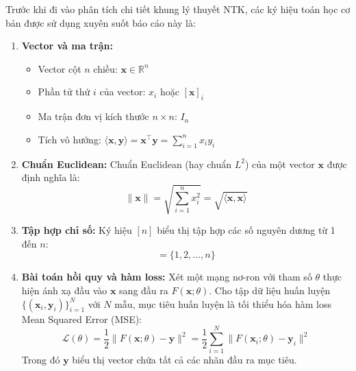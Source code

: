 Trước khi đi vào phân tích chi tiết khung lý thuyết NTK, các ký hiệu toán học cơ bản được sử dụng xuyên suốt báo cáo này là:

\begin{enumerate}
    \item \textbf{Vector và ma trận:}
    \begin{itemize}
        \item Vector cột $n$ chiều: $\mathbf{x} \in \mathbb{R}^n$
        \item Phần tử thứ $i$ của vector: $x_i$ hoặc $[\mathbf{x}]_i$
        \item Ma trận đơn vị kích thước $n \times n$: $I_n$
        \item Tích vô hướng: $\langle \mathbf{x}, \mathbf{y} \rangle = \mathbf{x}^\top \mathbf{y} = \sum_{i=1}^{n} x_i y_i$
    \end{itemize}
    
    \item \textbf{Chuẩn Euclidean:} Chuẩn Euclidean (hay chuẩn $L^2$) của một vector $\mathbf{x}$ được định nghĩa là:
    \begin{equation}
        \|\mathbf{x}\| = \sqrt{\sum_{i=1}^{n} x_i^2} = \sqrt{\langle \mathbf{x}, \mathbf{x} \rangle}
    \end{equation}
    
    \item \textbf{Tập hợp chỉ số:} Ký hiệu $[n]$ biểu thị tập hợp các số nguyên dương từ 1 đến $n$:
    \begin{equation}
        [n] = \{1, 2, \ldots, n\}
    \end{equation}
    
    \item \textbf{Bài toán hồi quy và hàm loss:} Xét một mạng nơ-ron với tham số $\theta$ thực hiện ánh xạ đầu vào $\mathbf{x}$ sang đầu ra $F(\mathbf{x}; \theta)$. Cho tập dữ liệu huấn luyện $\{(\mathbf{x}_i, \mathbf{y}_i)\}_{i=1}^{N}$ với $N$ mẫu, mục tiêu huấn luyện là tối thiểu hóa hàm loss Mean Squared Error (MSE):
    \begin{equation}
        \mathcal{L}(\theta) = \frac{1}{2} \|F(\mathbf{x}; \theta) - \mathbf{y}\|^2 = \frac{1}{2} \sum_{i=1}^{N} \|F(\mathbf{x}_i; \theta) - \mathbf{y}_i\|^2
    \end{equation}
    Trong đó $\mathbf{y}$ biểu thị vector chứa tất cả các nhãn đầu ra mục tiêu.
    

\end{enumerate}

